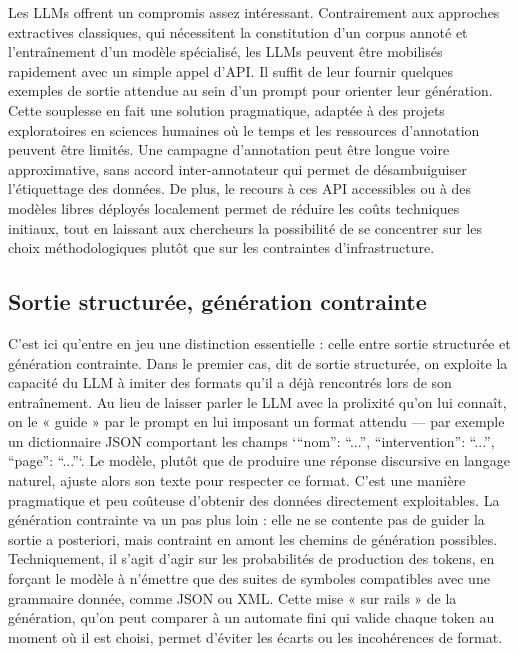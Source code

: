 Les LLMs offrent un compromis assez intéressant. Contrairement aux approches extractives classiques, qui nécessitent la constitution d’un corpus annoté et l’entraînement d’un modèle spécialisé, les LLMs peuvent être mobilisés rapidement avec un simple appel d'API. Il suffit de leur fournir quelques exemples de sortie attendue au sein d’un prompt pour orienter leur génération. Cette souplesse en fait une solution pragmatique, adaptée à des projets exploratoires en sciences humaines où le temps et les ressources d’annotation peuvent être limités. Une campagne d'annotation peut être longue voire approximative, sans accord inter-annotateur qui permet de désambuiguiser l'étiquettage des données. De plus, le recours à ces API accessibles ou à des modèles libres déployés localement permet de réduire les coûts techniques initiaux, tout en laissant aux chercheurs la possibilité de se concentrer sur les choix méthodologiques plutôt que sur les contraintes d’infrastructure. 

\subsection{Sortie structurée, génération contrainte}

C’est ici qu’entre en jeu une distinction essentielle : celle entre sortie structurée et génération contrainte. Dans le premier cas, dit de sortie structurée, on exploite la capacité du LLM à imiter des formats qu’il a déjà rencontrés lors de son entraînement. Au lieu de laisser parler le LLM avec la prolixité qu'on lui connaît, on le « guide » par le prompt en lui imposant un format attendu — par exemple un dictionnaire JSON comportant les champs `{\enquote{nom}: \enquote{...}, \enquote{intervention}: \enquote{...}, \enquote{page}: \enquote{...}}`. Le modèle, plutôt que de produire une réponse discursive en langage naturel, ajuste alors son texte pour respecter ce format. C’est une manière pragmatique et peu coûteuse d’obtenir des données directement exploitables. La génération contrainte va un pas plus loin : elle ne se contente pas de guider la sortie a posteriori, mais contraint en amont les chemins de génération possibles. Techniquement, il s’agit d’agir sur les probabilités de production des tokens, en forçant le modèle à n’émettre que des suites de symboles compatibles avec une grammaire donnée, comme JSON ou XML. Cette mise « sur rails » de la génération, qu’on peut comparer à un automate fini qui valide chaque token au moment où il est choisi, permet d’éviter les écarts ou les incohérences de format. 

